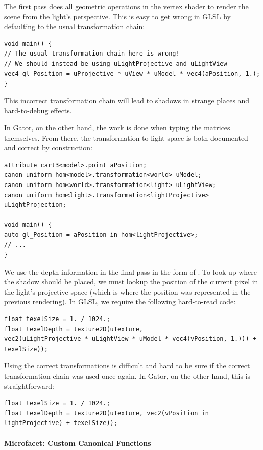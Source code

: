 \documentclass[../main.tex]{subfiles}
\begin{document}
{The first pass does all geometric operations in the vertex shader to render the scene from the light's perspective.  This is easy to get wrong in GLSL by defaulting to the usual transformation chain:
%
\begin{lstlisting}
void main() {
// The usual transformation chain here is wrong!
// We should instead be using uLightProjective and uLightView
vec4 gl_Position = uProjective * uView * uModel * vec4(aPosition, 1.);
}
\end{lstlisting}
%
This incorrect transformation chain will lead to shadows in strange places and hard-to-debug effects.

In Gator, on the other hand, the work is done when typing the matrices themselves.  From there, the transformation to light space is both documented and correct by construction:
%
\begin{lstlisting}
attribute cart3<model>.point aPosition;
canon uniform hom<model>.transformation<world> uModel;
canon uniform hom<world>.transformation<light> uLightView;
canon uniform hom<light>.transformation<lightProjective> uLightProjection;

void main() {
auto gl_Position = aPosition in hom<lightProjective>;
// ...
}
\end{lstlisting}
We use the depth information in the final pass in the form of .  To look up where the shadow should be placed, we must lookup the position of the current pixel in the light's projective space (which is where the position was represented in the previous rendering).
In GLSL, we require the following hard-to-read code:
\begin{lstlisting}
float texelSize = 1. / 1024.;
float texelDepth = texture2D(uTexture, 
vec2(uLightProjective * uLightView * uModel * vec4(vPosition, 1.))) + texelSize));
\end{lstlisting}
Using the correct transformations is difficult and hard to be sure if the correct transformation chain was used once again.  In Gator, on the other hand, this is straightforward:
\begin{lstlisting}
float texelSize = 1. / 1024.;
float texelDepth = texture2D(uTexture, vec2(vPosition in lightProjective) + texelSize));
\end{lstlisting}

\paragraph{Microfacet: Custom Canonical Functions}

}
\end{document}
